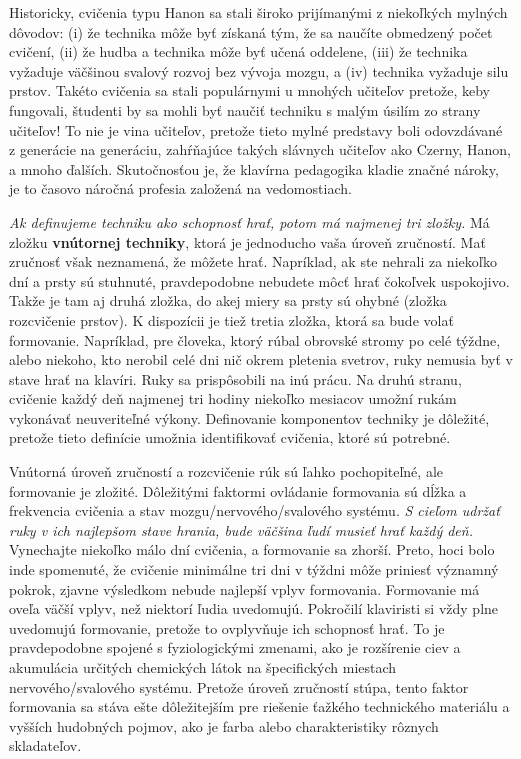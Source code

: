 Historicky, cvičenia typu Hanon sa stali široko prijímanými z niekoľkých mylných dôvodov: (i) že technika môže byť získaná tým, že sa naučíte obmedzený počet cvičení, (ii) že hudba a technika môže byť učená oddelene, (iii) že technika vyžaduje väčšinou svalový rozvoj bez vývoja mozgu, a (iv) technika vyžaduje silu prstov. Takéto cvičenia sa stali populárnymi u mnohých učiteľov pretože, keby fungovali, študenti by sa mohli byť naučiť techniku s malým úsilím zo strany učiteľov! To nie je vina učiteľov, pretože tieto mylné predstavy boli odovzdávané z generácie na generáciu, zahŕňajúce takých slávnych učiteľov ako Czerny, Hanon, a mnoho ďalších. Skutočnosťou je, že klavírna  pedagogika kladie značné nároky, je to časovo náročná profesia založená na vedomostiach.

\emph{Ak definujeme techniku ako schopnosť hrať, potom má najmenej tri zložky.} Má zložku \textbf{vnútornej techniky}, ktorá je jednoducho vaša úroveň zručností. Mať zručnosť však neznamená, že môžete hrať. Napríklad, ak ste nehrali za niekoľko dní a prsty sú stuhnuté, pravdepodobne nebudete môcť hrať čokoľvek uspokojivo. Takže je tam aj druhá zložka, do akej miery sa prsty sú ohybné (zložka rozcvičenie prstov). K dispozícii je tiež tretia zložka, ktorá sa bude volať formovanie. Napríklad, pre človeka, ktorý rúbal obrovské stromy po celé týždne, alebo niekoho, kto nerobil celé dni nič okrem pletenia svetrov, ruky nemusia byť v stave hrať na klavíri. Ruky sa prispôsobili na inú prácu. Na druhú stranu, cvičenie každý deň najmenej tri hodiny niekoľko mesiacov umožní rukám vykonávať neuveriteľné výkony. Definovanie komponentov techniky je dôležité, pretože tieto definície umožnia identifikovať cvičenia, ktoré sú potrebné.

Vnútorná úroveň zručností a rozcvičenie rúk sú ľahko pochopiteľné, ale formovanie je zložité. Dôležitými faktormi ovládanie formovania sú dĺžka a frekvencia cvičenia a stav mozgu/nervového/svalového systému. \emph{S cieľom udržať ruky v ich najlepšom stave hrania, bude väčšina ľudí musieť hrať každý deň.} Vynechajte niekoľko málo dní cvičenia, a formovanie sa zhorší. Preto, hoci bolo inde spomenuté, že cvičenie minimálne tri dni v týždni môže priniesť významný pokrok, zjavne výsledkom nebude najlepší vplyv formovania. Formovanie má oveľa väčší vplyv, než niektorí ľudia uvedomujú. Pokročilí klaviristi si vždy plne uvedomujú formovanie, pretože to ovplyvňuje ich schopnosť hrať. To je pravdepodobne spojené s fyziologickými zmenami, ako je rozšírenie ciev a akumulácia určitých chemických látok na špecifických miestach nervového/svalového systému. Pretože úroveň zručností stúpa, tento faktor formovania sa stáva ešte dôležitejším pre riešenie ťažkého technického materiálu a vyšších hudobných pojmov, ako je farba alebo charakteristiky rôznych skladateľov.

